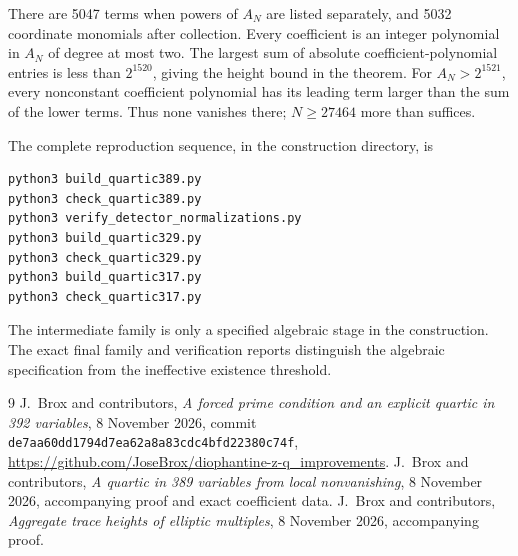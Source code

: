 \documentclass[11pt,a4paper]{article}
\theoremstyle{remark}\newtheorem{remark}[theorem]{Remark}
\begin{document}
There are 5047 terms when powers of $A_N$ are listed separately,
and 5032 coordinate monomials after collection. Every coefficient
is an integer polynomial in $A_N$ of degree at most two. The
largest sum of absolute coefficient-polynomial entries is less than
$2^{1520}$, giving the height bound in the theorem. For
$A_N>2^{1521}$, every nonconstant coefficient polynomial has its
leading term larger than the sum of the lower terms. Thus none
vanishes there; $N\ge27464$ more than suffices.

The complete reproduction sequence, in the construction directory, is
\begin{verbatim}
python3 build_quartic389.py
python3 check_quartic389.py
python3 verify_detector_normalizations.py
python3 build_quartic329.py
python3 check_quartic329.py
python3 build_quartic317.py
python3 check_quartic317.py
\end{verbatim}
The intermediate family is only a specified algebraic stage in
the construction. The exact final family and verification reports
distinguish the algebraic specification from the ineffective
existence threshold.

\begin{thebibliography}{9}
 J.~Brox and contributors,
\emph{A forced prime condition and an explicit quartic in 392 variables},
8 November 2026, commit
\nolinkurl{de7aa60dd1794d7ea62a8a83cdc4bfd22380c74f},
\url{https://github.com/JoseBrox/diophantine-z-q_improvements}.
 J.~Brox and contributors,
\emph{A quartic in 389 variables from local nonvanishing},
8 November 2026, accompanying proof and exact coefficient data.
 J.~Brox and contributors,
\emph{Aggregate trace heights of elliptic multiples},
8 November 2026, accompanying proof.
\end{thebibliography}
\end{document}

